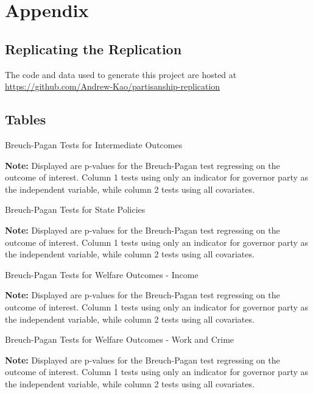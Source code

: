 \documentclass{article}
\begin{document}
\section{Appendix}

\subsection{Replicating the Replication}

The code and data used to generate this project are hosted at \url{https://github.com/Andrew-Kao/partisanship-replication}



\subsection{Tables}


\begin{table}[!hbtp]
\caption{Breuch-Pagan Tests for Intermediate Outcomes}

\textbf{Note:} Displayed are p-values for the Breuch-Pagan test regressing on the outcome of interest. Column 1 tests using only an indicator for governor party as the independent variable, while column 2 tests using all covariates. 
\label{table:bp_outcome}
\end{table}

\begin{table}[!hbtp]
\caption{Breuch-Pagan Tests for State Policies}

\textbf{Note:} Displayed are p-values for the Breuch-Pagan test regressing on the outcome of interest. Column 1 tests using only an indicator for governor party as the independent variable, while column 2 tests using all covariates. 
\label{table:bp_policies}
\end{table}

\begin{table}[!hbtp]
\caption{Breuch-Pagan Tests for Welfare Outcomes - Income}

\textbf{Note:} Displayed are p-values for the Breuch-Pagan test regressing on the outcome of interest. Column 1 tests using only an indicator for governor party as the independent variable, while column 2 tests using all covariates. 
\label{table:bp_welfare1}
\end{table}

\begin{table}[!hbtp]
\caption{Breuch-Pagan Tests for Welfare Outcomes - Work and Crime}

\textbf{Note:} Displayed are p-values for the Breuch-Pagan test regressing on the outcome of interest. Column 1 tests using only an indicator for governor party as the independent variable, while column 2 tests using all covariates. 
\label{table:bp_welfare2}
\end{table}
\end{document}
